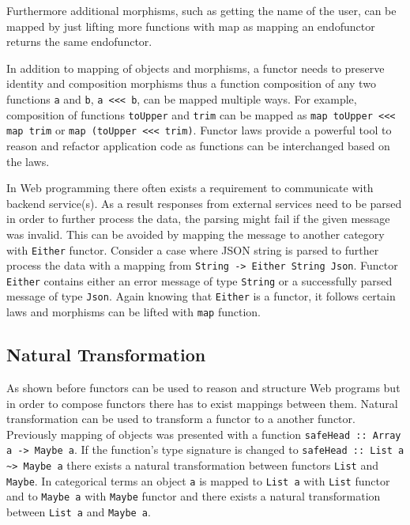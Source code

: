 \documentclass[article]{aaltoseries}
\begin{document}
    Furthermore additional morphisms, such as getting the name of the user, can
    be mapped by just lifting more functions with map as mapping an endofunctor
    returns the same endofunctor.
 
    In addition to mapping of objects and morphisms, a functor needs to preserve
    identity and composition morphisms thus a function composition of any two
    functions \lstinline|a| and \lstinline|b|, \lstinline|a <<< b|, can be
    mapped multiple ways. For example, composition of functions
    \lstinline|toUpper| and \lstinline|trim| can be mapped as
    \lstinline|map toUpper <<< map trim| or \lstinline|map (toUpper <<< trim)|.
    Functor laws provide a powerful tool to reason and refactor application code
    as functions can be interchanged based on the laws.

    In Web programming there often exists a requirement to communicate with
    backend service(s). As a result responses from external services need to be
    parsed in order to further process the data, the parsing might fail if the
    given message was invalid. This can be avoided by mapping the message to
    another category with \lstinline|Either| functor. Consider a case where JSON
    string is parsed to further process the data with a mapping from
    \lstinline|String -> Either String Json|. Functor \lstinline|Either|
    contains either an error message of type \lstinline|String| or a
    successfully parsed message of type \lstinline|Json|. Again knowing that
    \lstinline|Either| is a functor, it follows certain laws and morphisms can
    be lifted with \lstinline|map| function.



  \subsection{Natural Transformation}
    As shown before functors can be used to reason and structure Web programs
    but in order to compose functors there has to exist mappings between them.
    Natural transformation can be used to transform a functor to a another
    functor. Previously mapping of objects was presented with a function
    \lstinline|safeHead :: Array a -> Maybe a|. If the function’s type signature
    is changed to \lstinline|safeHead :: List a ~> Maybe a| there exists a
    natural transformation between functors \lstinline|List| and
    \lstinline|Maybe|. In categorical terms an object \lstinline|a| is mapped to
    \lstinline|List a| with \lstinline|List| functor and to \lstinline|Maybe a| with
    \lstinline|Maybe| functor and there exists a natural transformation between
    \lstinline|List a| and \lstinline|Maybe a|.
\end{document}
